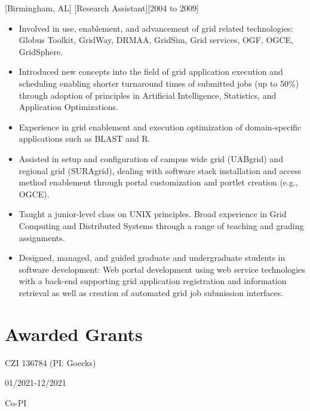 \documentclass{article}
\begin{document}
[Birmingham, AL]
[Research Assistant][2004 to 2009]
\begin{itemize}
    \item Involved in use, enablement, and advancement of grid related technologies: Globus Toolkit, GridWay, DRMAA, GridSim, Grid services, OGF, OGCE, GridSphere.
    \item Introduced new concepts into the field of grid application execution and scheduling enabling shorter turnaround times of submitted jobs (up to 50\%) through adoption of principles in Artificial Intelligence, Statistics, and Application Optimizations.
    \item Experience in grid enablement and execution optimization of domain-specific applications such as BLAST and R.
    \item Assisted in setup and configuration of campus wide grid (UABgrid) and regional grid (SURAgrid), dealing with software stack installation and access method enablement through portal customization and portlet creation (e.g., OGCE).
    \item Taught a junior-level class on UNIX principles. Broad experience in Grid Computing and Distributed Systems through a range of teaching and grading assignments. 
    \item Designed, managed, and guided graduate and undergraduate students in software development: Web portal development using web service technologies with a back-end supporting grid application registration and information retrieval as well as creation of automated grid job submission interfaces.
\end{itemize}

%
%

\vspace{\parskip}
\section{Awarded Grants}

\vspace{\parskip}
\vspace{\parskip}
\begin{description}[widest=Project Period]
    \item[Project \#] CZI 136784 (PI: Goecks)
    \item[Project Period] 01/2021-12/2021
    \item[Role] Co-PI
\end{description}
\end{document}
